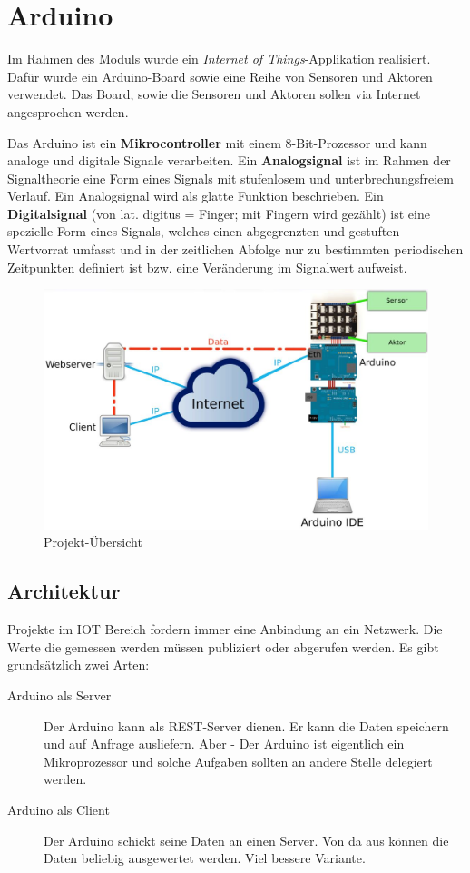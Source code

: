 \chapter{Arduino}
Im Rahmen des Moduls wurde ein \emph{Internet of Things}-Applikation realisiert. Dafür wurde ein Arduino-Board sowie eine Reihe von Sensoren und Aktoren verwendet. Das Board, sowie die Sensoren und Aktoren sollen via Internet angesprochen werden.

Das Arduino ist ein \textbf{Mikrocontroller} mit einem 8-Bit-Prozessor und kann analoge und digitale Signale verarbeiten. Ein \textbf{Analogsignal} ist im Rahmen der Signaltheorie eine Form eines Signals mit stufenlosem und unterbrechungsfreiem Verlauf. Ein Analogsignal wird als glatte Funktion beschrieben. Ein \textbf{Digitalsignal} (von lat. digitus = Finger; mit Fingern wird gezählt) ist eine spezielle Form eines Signals, welches einen abgegrenzten und gestuften Wertvorrat umfasst und in der zeitlichen Abfolge nur zu bestimmten periodischen Zeitpunkten definiert ist bzw. eine Veränderung im Signalwert aufweist.

\begin{figure}[h!]
\centering
\includegraphics[width=0.7\linewidth]{fig/aruduino-projekt}
\caption{Projekt-Übersicht}
\label{fig:aruduino-projekt}
\end{figure}

\section{Architektur}
Projekte im IOT Bereich fordern immer eine Anbindung an ein Netzwerk. Die Werte die gemessen werden müssen publiziert oder abgerufen werden. Es gibt grundsätzlich zwei Arten:
\begin{description}
	\item[Arduino als Server] Der Arduino kann als REST-Server dienen. Er kann die Daten speichern und auf Anfrage ausliefern. Aber - Der Arduino ist eigentlich ein Mikroprozessor und solche Aufgaben sollten an andere Stelle delegiert werden. 
	\item[Arduino als Client] Der Arduino schickt seine Daten an einen Server. Von da aus können die Daten beliebig ausgewertet werden. Viel bessere Variante.
\end{description}

